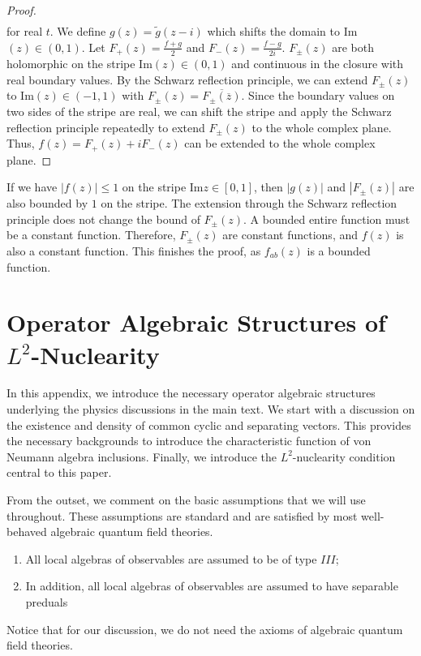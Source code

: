 \documentclass[a4paper,11pt]{article}
\theoremstyle{definition}
\begin{document}
{\begin{proof}
\begin{align}
    \end{align}  
    for real $t$. We define $g(z) = \tilde{g}(z-i)$ which shifts the domain to Im$(z) \in (0,1)$. Let $F_+(z) = \frac{f+g}{2}$ and $F_-(z) = \frac{f-g}{2i}$. $F_\pm(z)$ are both holomorphic on the stripe Im$(z) \in (0,1)$ and continuous in the closure with real boundary values. By the Schwarz reflection principle, we can extend $F_\pm(z)$ to Im$(z) \in (-1,1)$ with $F_\pm(z) = \overline{F_\pm(\overline{z})}$. Since the boundary values on two sides of the stripe are real, we can shift the stripe and apply the Schwarz reflection principle repeatedly to extend $F_\pm(z)$ to the whole complex plane. Thus, $f(z) = F_+(z) + i F_-(z)$ can be extended to the whole complex plane.
\end{proof}
If we have $|f(z)|\leq 1$ on the stripe Im$z \in [0,1]$, then $|g(z)|$ and $|F_\pm(z)|$ are also bounded by $1$ on the stripe. The extension through the Schwarz reflection principle does not change the bound of $F_\pm(z)$. A bounded entire function must be a constant function. Therefore, $F_\pm(z)$ are constant functions, and $f(z)$ is also a constant function. This finishes the proof, as $f_{ab}(z)$ is a bounded function. }

\section{Operator Algebraic Structures of $L^2$-Nuclearity}\label{appendix:operatoralgebraicstructure}
In this appendix, we introduce the necessary operator algebraic structures underlying the physics discussions in the main text. We start with a discussion on the existence and density of common cyclic and separating vectors. This provides the necessary backgrounds to introduce the characteristic function of von Neumann algebra inclusions. Finally, we introduce the $L^2$-nuclearity condition central to this paper.

From the outset, we comment on the basic assumptions that we will use throughout. These assumptions are standard and are satisfied by most well-behaved algebraic quantum field theories.
\begin{enumerate}
    \item All local algebras of observables are assumed to be of type $III$;
    \item In addition, all local algebras of observables are assumed to have separable preduals
\end{enumerate}
Notice that for our discussion, we do not need the axioms of algebraic quantum field theories.
\end{document}
